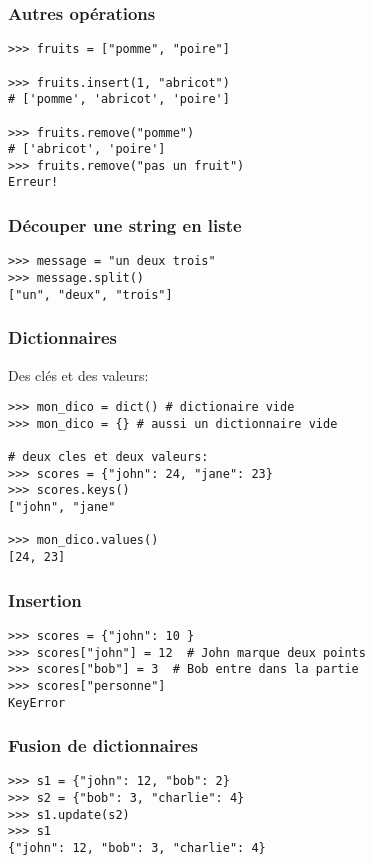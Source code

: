 \documentclass{beamer}
\begin{document}
\begin{frame}[fragile]
  \frametitle{Autres opérations}

\begin{lstlisting}
>>> fruits = ["pomme", "poire"]

>>> fruits.insert(1, "abricot")
# ['pomme', 'abricot', 'poire']

>>> fruits.remove("pomme")
# ['abricot', 'poire']
>>> fruits.remove("pas un fruit")
Erreur!
\end{lstlisting}

\end{frame}

\begin{frame}[fragile]
  \frametitle{Découper une string en liste}

\begin{lstlisting}
>>> message = "un deux trois"
>>> message.split()
["un", "deux", "trois"]
\end{lstlisting}
\end{frame}


\begin{frame}[fragile]
  \frametitle{Dictionnaires}

Des clés et des valeurs:

\begin{lstlisting}
>>> mon_dico = dict() # dictionaire vide
>>> mon_dico = {} # aussi un dictionnaire vide

# deux cles et deux valeurs:
>>> scores = {"john": 24, "jane": 23}
>>> scores.keys()
["john", "jane"

>>> mon_dico.values()
[24, 23]
\end{lstlisting}

\end{frame}

\begin{frame}[fragile]
  \frametitle{Insertion}
\begin{lstlisting}
>>> scores = {"john": 10 }
>>> scores["john"] = 12  # John marque deux points
>>> scores["bob"] = 3  # Bob entre dans la partie
>>> scores["personne"]
KeyError
\end{lstlisting}
\end{frame}

\begin{frame}[fragile]
  \frametitle{Fusion de dictionnaires}

\begin{lstlisting}
>>> s1 = {"john": 12, "bob": 2}
>>> s2 = {"bob": 3, "charlie": 4}
>>> s1.update(s2)
>>> s1
{"john": 12, "bob": 3, "charlie": 4}
\end{lstlisting}
\end{frame}
\end{document}
